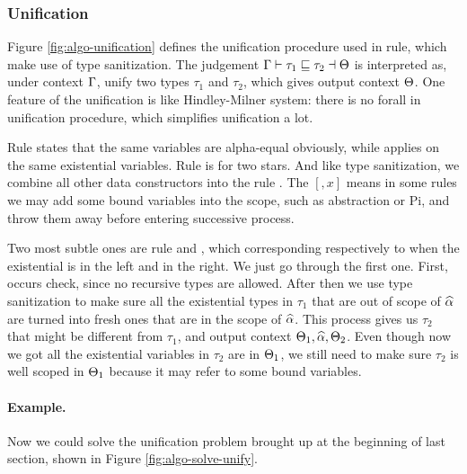 \subsubsection{Unification}

Figure \ref{fig:algo-unification} defines the unification procedure used in  rule, which make use of type sanitization. The judgement $\Gamma {} \vdash \tau_1 \sqsubseteq \tau_2 \dashv \Theta$ is interpreted as, under context $\Gamma$, unify two types $\tau_1$ and $\tau_2$, which gives output context $\Theta$. One feature of the unification is like Hindley-Milner system: there is no forall in unification procedure, which simplifies unification a lot.

Rule  states that the same variables are alpha-equal obviously, while  applies on the same existential variables. Rule  is for two stars. And like type sanitization, we combine all other data constructors into the rule . The $[,x]$ means in some rules we may add some bound variables into the scope, such as abstraction or Pi, and throw them away before entering successive process.

Two most subtle ones are rule  and , which corresponding respectively to when the existential is in the left and in the right. We just go through the first one. First, occurs check, since no recursive types are allowed. After then we use type sanitization to make sure all the existential types in $\tau_1$ that are out of scope of $\widehat{\alpha}$ are turned into fresh ones that are in the scope of $\widehat{\alpha}$. This process gives us $\tau_2$ that might be different from $\tau_1$, and output context $\Theta_1, \widehat{\alpha}, \Theta_2$. Even though now we got all the existential variables in $\tau_2$ are in $\Theta_1$, we still need to make sure $\tau_2$ is well scoped in $\Theta_1$ because it may refer to some bound variables.

\paragraph{Example.} Now we could solve the unification problem brought up at the beginning of last section, shown in Figure \ref{fig:algo-solve-unify}.

